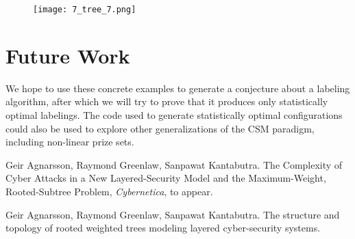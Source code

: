\documentclass[a4paper]{amsproc}
\theoremstyle{plain}
\theoremstyle{named}
\theoremstyle{definition}
\begin{document}
\begin{figure}[H]
\texttt{[image: 7\_tree\_7.png]}
\caption{}
\label{fig:M2}
\end{figure}




\section{Future Work}

We hope to use these concrete examples to generate a conjecture about a labeling algorithm, after which we will try to prove that it produces only statistically optimal labelings.
The code used to generate statistically optimal configurations could also be used to explore other generalizations of the CSM paradigm, including non-linear prize sets.

\begin{thebibliography}{9}

  Geir Agnarsson, Raymond Greenlaw, Sanpawat Kantabutra.
  The Complexity of Cyber Attacks in a New Layered-Security Model and the Maximum-Weight, Rooted-Subtree Problem,
  \emph{Cybernetica}, to appear.

  Geir Agnarsson, Raymond Greenlaw, Sanpawat Kantabutra.
  The structure and topology of rooted weighted trees modeling layered cyber-security systems.

\end{thebibliography}
\end{document}
